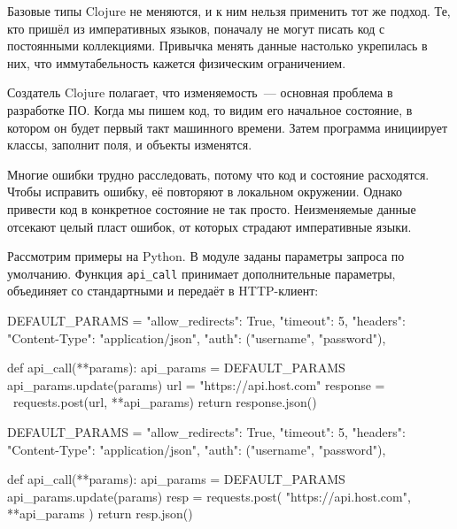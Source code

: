 Базовые типы Clojure не меняются, и к ним нельзя применить тот же подход. Те,
кто пришёл из императивных языков, поначалу не могут писать код с постоянными
коллекциями. Привычка менять данные настолько укрепилась в них, что
иммутабельность кажется физическим ограничением.

Создатель Clojure полагает, что изменяемость~--- основная проблема в разработке
ПО. Когда мы пишем код, то видим его начальное состояние, в котором он будет
первый такт машинного времени. Затем программа инициирует классы, заполнит поля,
и объекты изменятся.

Многие ошибки трудно расследовать, потому что код и состояние расходятся. Чтобы
исправить ошибку, её повторяют в локальном окружении. Однако привести код в
конкретное состояние не так просто. Неизменяемые данные отсекают целый пласт
ошибок, от которых страдают императивные языки.


Рассмотрим примеры на Python. В модуле заданы параметры запроса по
умолчанию. Функция \verb|api_call| принимает дополнительные параметры,
объединяет со стандартными и передаёт в HTTP-клиент:

\ifnarrow

\begin{english}
  \begin{python/lines}
DEFAULT_PARAMS = {
    "allow_redirects": True,
    "timeout": 5,
    "headers": {"Content-Type":
                "application/json"},
    "auth": ("username", "password"),
}

def api_call(**params):
    api_params = DEFAULT_PARAMS
    api_params.update(params)
    url = "https://api.host.com"
    response = \
      requests.post(url, **api_params)
    return response.json()
  \end{python/lines}
\end{english}

\else

\begin{english}
  \begin{python/lines}
DEFAULT_PARAMS = {
    "allow_redirects": True,
    "timeout": 5,
    "headers": {"Content-Type": "application/json"},
    "auth": ("username", "password"),
}

def api_call(**params):
    api_params = DEFAULT_PARAMS
    api_params.update(params)
    resp = requests.post(
        "https://api.host.com", **api_params
    )
    return resp.json()
  \end{python/lines}
\end{english}


